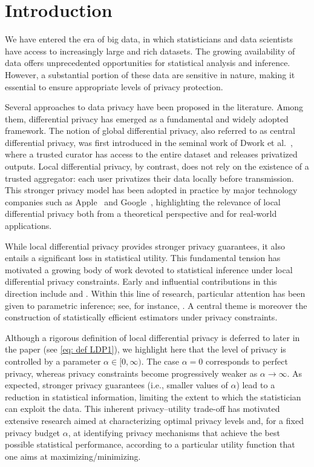 \documentclass[a4paper, 11pt]{article}
\theoremstyle{definition}
\begin{document}
\tableofcontents


\section{Introduction}{\label{s: intro}

We have entered the era of big data, in which statisticians and data scientists have access to increasingly large and rich datasets. The growing availability of data offers unprecedented opportunities for statistical analysis and inference. However, a substantial portion of these data are sensitive in nature, making it essential to ensure appropriate levels of privacy protection.

Several approaches to data privacy have been proposed in the literature. Among them, differential privacy has emerged as a fundamental and widely adopted framework. The notion of global differential privacy, also referred to as central differential privacy, was first introduced in the seminal work of Dwork et al.~\cite{Dwo06}, where a trusted curator has access to the entire dataset and releases privatized outputs. Local differential privacy, by contrast, does not rely on the existence of a trusted aggregator: each user privatizes their data locally before transmission. This stronger privacy model has been adopted in practice by major technology companies such as Apple~\cite{5LDP,49LDP} and Google~\cite{1LDP,23LDP}, highlighting the relevance of local differential privacy both from a theoretical perspective and for real-world applications.

While local differential privacy provides stronger privacy guarantees, it also entails a significant loss in statistical utility. This fundamental tension has motivated a growing body of work devoted to statistical inference under local differential privacy constraints. Early and influential contributions in this direction include \cite{duchi2018minimax} and \cite{wasserman2010statistical}. Within this line of research, particular attention has been given to parametric inference; see, for instance, \cite{amorino2025evolving, asi2022optimal, duchi2019lower, joseph2019locally, kalinin2024efficient}. A central theme is moreover the construction of statistically efficient estimators under privacy constraints.

Although a rigorous definition of local differential privacy is deferred to later in the paper (see \eqref{eq: def LDP1}), we highlight here that the level of privacy is controlled by a parameter \( \alpha \in [0,\infty) \). The case \( \alpha = 0 \) corresponds to perfect privacy, whereas privacy constraints become progressively weaker as \( \alpha \to \infty \). As expected, stronger privacy guarantees (i.e., smaller values of \( \alpha \)) lead to a reduction in statistical information, limiting the extent to which the statistician can exploit the data. This inherent privacy--utility trade-off has motivated extensive research aimed at characterizing optimal privacy levels and, for a fixed privacy budget \( \alpha \), at identifying privacy mechanisms that achieve the best possible statistical performance, according to a particular utility function that one aims at maximizing/minimizing.

}
\end{document}
